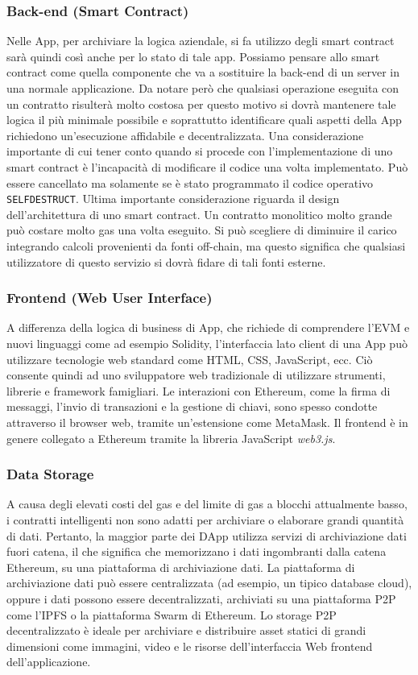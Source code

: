 \subsubsection{Back-end (Smart Contract)}
Nelle \DH App, per archiviare la logica aziendale, si fa utilizzo degli smart contract sarà quindi così anche per lo stato di tale app. Possiamo pensare allo smart contract come quella componente che va a sostituire la back-end di un server in una normale applicazione. Da notare però che qualsiasi operazione eseguita con un contratto risulterà molto costosa per questo motivo si dovrà mantenere tale logica il più minimale possibile e soprattutto identificare quali aspetti della \DH App richiedono un'esecuzione affidabile e decentralizzata. Una considerazione importante di cui tener conto quando si procede con l'implementazione di uno smart contract è l'incapacità di modificare il codice una volta implementato. Può essere cancellato ma solamente se è stato programmato il codice operativo \lstinline|SELFDESTRUCT|. Ultima importante considerazione riguarda il design dell'architettura di uno smart contract. Un contratto monolitico molto grande può costare molto gas una volta eseguito. Si può scegliere di diminuire il carico integrando calcoli provenienti da fonti off-chain, ma questo significa che qualsiasi utilizzatore di questo servizio si dovrà fidare di tali fonti esterne.

\subsubsection{Frontend (Web User Interface)}
A differenza della logica di business di \DH App, che richiede di comprendere l'EVM e nuovi linguaggi come ad esempio Solidity, l'interfaccia lato client di una \DH App può utilizzare tecnologie web standard come HTML, CSS, JavaScript, ecc. Ciò consente quindi ad uno sviluppatore web tradizionale di utilizzare strumenti, librerie e framework famigliari. Le interazioni con Ethereum, come la firma di messaggi, l'invio di transazioni e la gestione di chiavi, sono spesso condotte attraverso il browser web, tramite un'estensione come MetaMask. Il frontend è in genere collegato a Ethereum tramite la libreria JavaScript \textit{web3.js}. 

\subsubsection{Data Storage}
A causa degli elevati costi del gas e del limite di gas a blocchi attualmente basso, i contratti intelligenti non sono adatti per archiviare o elaborare grandi quantità di dati. Pertanto, la maggior parte dei DApp utilizza servizi di archiviazione dati fuori catena, il che significa che memorizzano i dati ingombranti dalla catena Ethereum, su una piattaforma di archiviazione dati. La piattaforma di archiviazione dati può essere centralizzata (ad esempio, un tipico database cloud), oppure i dati possono essere decentralizzati, archiviati su una piattaforma P2P come l'IPFS o la piattaforma Swarm di Ethereum.
Lo storage P2P decentralizzato è ideale per archiviare e distribuire asset statici di grandi dimensioni come immagini, video e le risorse dell'interfaccia Web frontend dell'applicazione.

